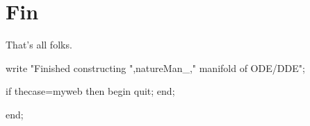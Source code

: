 \documentclass[11pt,a5paper]{article}
\begin{document}


\section{Fin}

That's all folks. 

\begin{reduce}
write "Finished constructing ",natureMan_," manifold of ODE/DDE"; 
\end{reduce}

\begin{reduce}
if thecase=myweb then begin
quit;
end;
\end{reduce}

\begin{reduce}
end;
\end{reduce}





\end{document}

